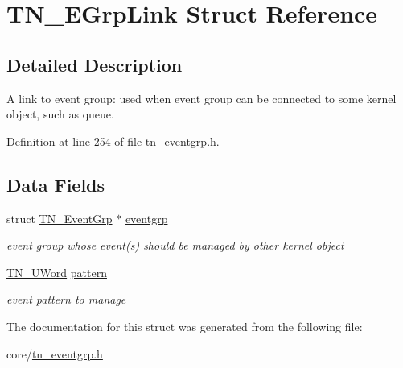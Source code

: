 \hypertarget{structTN__EGrpLink}{}\section{T\+N\+\_\+\+E\+Grp\+Link Struct Reference}
\label{structTN__EGrpLink}


\subsection{Detailed Description}
A link to event group\+: used when event group can be connected to some kernel object, such as queue. 

Definition at line 254 of file tn\+\_\+eventgrp.\+h.

\subsection*{Data Fields}
\begin{DoxyCompactItemize}
\item 
\mbox{\label{structTN__EGrpLink_a033de1028488c16a62718b2e9c8eb37f}} 
struct \hyperlink{structTN__EventGrp}{T\+N\+\_\+\+Event\+Grp} $\ast$ \hyperlink{structTN__EGrpLink_a033de1028488c16a62718b2e9c8eb37f}{eventgrp}
\begin{DoxyCompactList}\small\item\em event group whose event(s) should be managed by other kernel object \end{DoxyCompactList}\item 
\mbox{\label{structTN__EGrpLink_a576dde889abb0efae1f253c12a1eed64}} 
\hyperlink{tn__arch__example_8h_ab80cba0fe9ffcd9011d53dfeb9e39bf4}{T\+N\+\_\+\+U\+Word} \hyperlink{structTN__EGrpLink_a576dde889abb0efae1f253c12a1eed64}{pattern}
\begin{DoxyCompactList}\small\item\em event pattern to manage \end{DoxyCompactList}\end{DoxyCompactItemize}


The documentation for this struct was generated from the following file\+:\begin{DoxyCompactItemize}
\item 
core/\hyperlink{tn__eventgrp_8h}{tn\+\_\+eventgrp.\+h}\end{DoxyCompactItemize}
